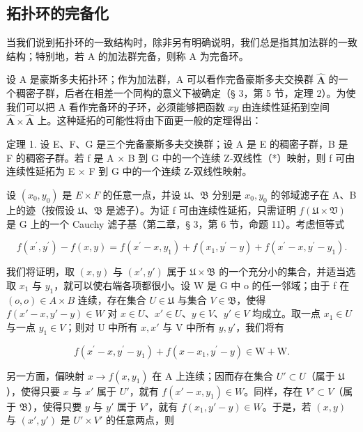 \subsection{拓扑环的完备化}

当我们说到拓扑环的一致结构时，除非另有明确说明，我们总是指其加法群的一致结构；特别地，若 A 的加法群完备，则称 A 为完备环。

设 A 是豪斯多夫拓扑环；作为加法群，A 可以看作完备豪斯多夫交换群 \(\hat{\mathbf{A}}\) 的一个稠密子群，后者在相差一个同构的意义下被确定（§ 3，第 5 节，定理 2）。为使我们可以把 A 看作完备环的子环，必须能够把函数 \(xy\) 由连续性延拓到空间 \(\hat{\mathbf{A}} \times \hat{\mathbf{A}}\) 上。这种延拓的可能性将由下面更一般的定理得出：

定理 1. 设 E、F、G 是三个完备豪斯多夫交换群；设 A 是 E 的稠密子群，B 是 F 的稠密子群。若 f 是 A × B 到 G 中的一个连续 Z-双线性（*）映射，则 f 可由连续性延拓为 E × F 到 G 中的一个连续 Z-双线性映射。

设 \((x_{0}, y_{0})\) 是 \(E \times F\) 的任意一点，并设 \(\mathfrak{U}\)、\(\mathfrak{B}\) 分别是 \(x_{0}, y_{0}\) 的邻域滤子在 A、B 上的迹（按假设 \(\mathfrak{U}\)、\(\mathfrak{B}\) 是滤子）。为证 f 可由连续性延拓，只需证明 \(f(\mathfrak{U} \times \mathfrak{V})\) 是 G 上的一个 Cauchy 滤子基（第二章，§ 3，第 6 节，命题 11）。考虑恒等式

\[
f \left(x ^ {\prime}, y ^ {\prime}\right) - f (x, y) = f \left(x ^ {\prime} - x, y _ {1}\right) + f \left(x _ {1}, y ^ {\prime} - y\right) + f \left(x ^ {\prime} - x, y ^ {\prime} - y _ {1}\right).
\]

我们将证明，取 \((x, y)\) 与 \((x', y')\) 属于 \(\mathfrak{U} \times \mathfrak{B}\) 的一个充分小的集合，并适当选取 \(x_{1}\) 与 \(y_{1}\)，就可以使右端各项都很小。设 W 是 G 中 o 的任一邻域；由于 f 在 \((o, o) \in A \times B\) 连续，存在集合 \(U \in \mathfrak{U}\) 与集合 \(V \in \mathfrak{B}\)，使得 \(f(x' - x, y' - y) \in W\) 对 \(x \in U\)、\(x' \in U\)、\(y \in V\)、\(y' \in V\) 均成立。取一点 \(x_{1} \in U\) 与一点 \(y_{1} \in V\)；则对 U 中所有 \(x, x'\) 与 V 中所有 \(y, y'\)，我们将有

\[
f \left(x ^ {\prime} - x, y ^ {\prime} - y _ {1}\right) + f \left(x - x _ {1}, y ^ {\prime} - y\right) \in \mathrm{W} + \mathrm{W}.
\]

另一方面，偏映射 \(x \to f(x, y_1)\) 在 A 上连续；因而存在集合 \(U' \subset U\)（属于 \(\mathfrak{U}\)），使得只要 \(x\) 与 \(x'\) 属于 \(U'\)，就有 \(f(x' - x, y_1) \in W\)。同样，存在 \(V' \subset V\)（属于 \(\mathfrak{B}\)），使得只要 \(y\) 与 \(y'\) 属于 \(V'\)，就有 \(f(x_1, y' - y) \in W\)。于是，若 \((x, y)\) 与 \((x', y')\) 是 \(U' \times V'\) 的任意两点，则


